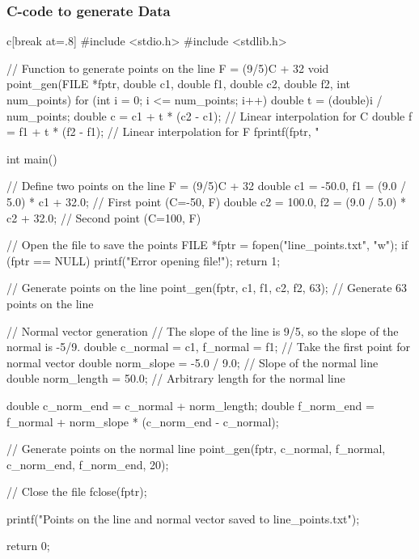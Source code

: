 \documentclass{beamer}
\theoremstyle{remark}
\numberwithin{equation}{section}
\begin{document}
\begin{frame}
\frametitle{C-code to generate Data}
\begin{mintedbox}{c}[break at=.8\textheight]
#include <stdio.h>
#include <stdlib.h>

// Function to generate points on the line F = (9/5)C + 32
void point_gen(FILE *fptr, double c1, double f1, double c2, double f2, int num_points) {
    for (int i = 0; i <= num_points; i++) {
        double t = (double)i / num_points;
        double c = c1 + t * (c2 - c1); // Linear interpolation for C
        double f = f1 + t * (f2 - f1); // Linear interpolation for F
        fprintf(fptr, "%
    }
}

int main() {
    // Define two points on the line F = (9/5)C + 32
    double c1 = -50.0, f1 = (9.0 / 5.0) * c1 + 32.0;  // First point (C=-50, F)
    double c2 = 100.0, f2 = (9.0 / 5.0) * c2 + 32.0;  // Second point (C=100, F)
    
    // Open the file to save the points
    FILE *fptr = fopen("line_points.txt", "w");
    if (fptr == NULL) {
        printf("Error opening file!\n");
        return 1;
    }

    // Generate points on the line
    point_gen(fptr, c1, f1, c2, f2, 63);  // Generate 63 points on the line

    // Normal vector generation
    // The slope of the line is 9/5, so the slope of the normal is -5/9.
    double c_normal = c1, f_normal = f1;  // Take the first point for normal vector
    double norm_slope = -5.0 / 9.0;       // Slope of the normal line
    double norm_length = 50.0;            // Arbitrary length for the normal line

    double c_norm_end = c_normal + norm_length;
    double f_norm_end = f_normal + norm_slope * (c_norm_end - c_normal);

    // Generate points on the normal line
    point_gen(fptr, c_normal, f_normal, c_norm_end, f_norm_end, 20);

    // Close the file
    fclose(fptr);

    printf("Points on the line and normal vector saved to line_points.txt\n");

    return 0;
}


\end{mintedbox}
\end{frame}
\end{document}
